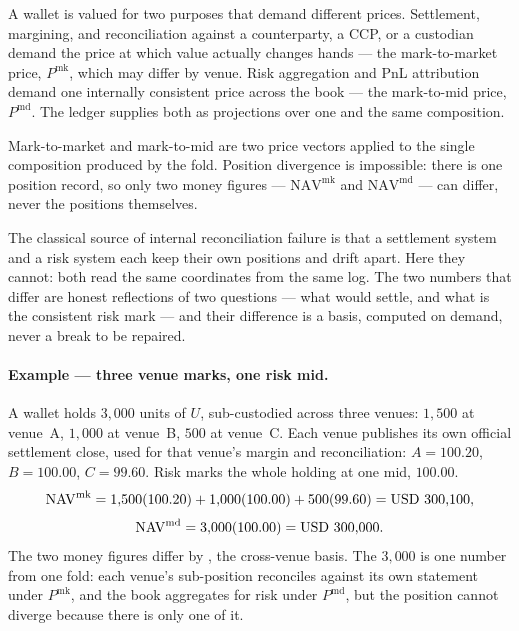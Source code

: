 A wallet is valued for two purposes that demand different prices. Settlement,
margining, and reconciliation against a counterparty, a CCP, or a custodian
demand the price at which value actually changes hands --- the mark-to-market
price, $P^{\mathrm{mk}}$, which may differ by venue. Risk aggregation and PnL
attribution demand one internally consistent price across the book --- the
mark-to-mid price, $P^{\mathrm{md}}$. The ledger supplies both as projections
over one and the same composition.

\begin{principle}
Mark-to-market and mark-to-mid are two price vectors applied to the single
composition produced by the fold. Position divergence is impossible: there is
one position record, so only two money figures --- $\mathrm{NAV}^{\mathrm{mk}}$
and $\mathrm{NAV}^{\mathrm{md}}$ --- can differ, never the positions
themselves.
\end{principle}

The classical source of internal reconciliation failure is that a settlement
system and a risk system each keep their own positions and drift apart. Here
they cannot: both read the same coordinates from the same log. The two numbers
that differ are honest reflections of two questions --- what would settle, and
what is the consistent risk mark --- and their difference is a basis, computed
on demand, never a break to be repaired.

\paragraph{Example --- three venue marks, one risk mid.}
A wallet holds $3{,}000$ units of $U$, sub-custodied across three venues:
$1{,}500$ at venue~A, $1{,}000$ at venue~B, $500$ at venue~C. Each venue
publishes its own official settlement close, used for that venue's margin and
reconciliation: $A = 100.20$, $B = 100.00$, $C = 99.60$. Risk marks the whole
holding at one mid, $100.00$.
\[
  \mathrm{NAV}^{\mathrm{mk}} = 1{,}500(100.20) + 1{,}000(100.00) + 500(99.60)
    = \mbox{USD~300,100},
\]
\[
  \mathrm{NAV}^{\mathrm{md}} = 3{,}000(100.00) = \mbox{USD~300,000}.
\]
The two money figures differ by , the cross-venue basis. The
$3{,}000$ is one number from one fold: each venue's sub-position reconciles
against its own statement under $P^{\mathrm{mk}}$, and the book aggregates for
risk under $P^{\mathrm{md}}$, but the position cannot diverge because there is
only one of it.


